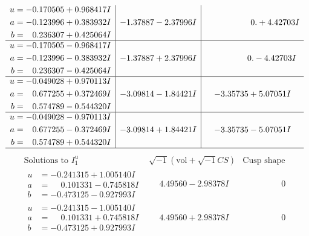 \documentclass[1p]{elsarticle_modified}
\theoremstyle{definition}
\newcommand{\I}{\sqrt{-1}}
\begin{document}
$$\begin{array}{c|c|c}
\begin{aligned}
u &= -0.170505 + 0.968417 I \\
a &= -0.123996 + 0.383932 I \\
b &= \phantom{-}0.236307 + 0.425064 I\end{aligned}
 & -1.37887 - 2.37996 I & \phantom{-0.000000 -}0. + 4.42703 I \\ \hline\begin{aligned}
u &= -0.170505 - 0.968417 I \\
a &= -0.123996 - 0.383932 I \\
b &= \phantom{-}0.236307 - 0.425064 I\end{aligned}
 & -1.37887 + 2.37996 I & \phantom{-0.000000 } 0. - 4.42703 I \\ \hline\begin{aligned}
u &= -0.049028 + 0.970113 I \\
a &= \phantom{-}0.677255 + 0.372469 I \\
b &= \phantom{-}0.574789 - 0.544320 I\end{aligned}
 & -3.09814 - 1.84421 I & -3.35735 + 5.07051 I \\ \hline\begin{aligned}
u &= -0.049028 - 0.970113 I \\
a &= \phantom{-}0.677255 - 0.372469 I \\
b &= \phantom{-}0.574789 + 0.544320 I\end{aligned}
 & -3.09814 + 1.84421 I & -3.35735 - 5.07051 I\\
 \hline 
 \end{array}$$\newpage$$\begin{array}{c|c|c}  
\text{Solutions to }I^u_{1}& \I (\text{vol} + \sqrt{-1}CS) & \text{Cusp shape}\\
 \hline 
\begin{aligned}
u &= -0.241315 + 1.005140 I \\
a &= \phantom{-}0.101331 - 0.745818 I \\
b &= -0.473125 - 0.927993 I\end{aligned}
 & \phantom{-}4.49560 - 2.98378 I & \phantom{-0.000000 } 0 \\ \hline\begin{aligned}
u &= -0.241315 - 1.005140 I \\
a &= \phantom{-}0.101331 + 0.745818 I \\
b &= -0.473125 + 0.927993 I\end{aligned}
 & \phantom{-}4.49560 + 2.98378 I & \phantom{-0.000000 } 0 \\ \hline\begin{aligned}

\end{aligned}
\end{array}$$
\end{document}
